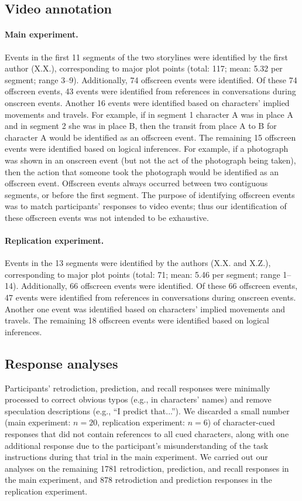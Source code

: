 \documentclass[10pt]{article}
\begin{document}
\subsection*{Video annotation}

\paragraph{Main experiment.} Events in the first 11 segments of the two storylines were identified by the first author (X.X.), corresponding to major plot points (total: 117; mean: 5.32 per segment; range 3--9). Additionally, 74 offscreen events were identified. Of these 74 offscreen events, 43 events were identified from references in conversations during onscreen events. Another 16 events were identified based on characters’ implied movements and travels. For example, if in segment 1 character A was in place A and in segment 2 she was in place B, then the transit from place A to B for character A would be identified as an offscreen event. The remaining 15 offscreen events were identified based on logical inferences. For example, if a photograph was shown in an onscreen event (but not the act of the photograph being taken), then the action that someone took the photograph would be identified as an offscreen event. Offscreen events always occurred between two contiguous segments, or before the first segment. The purpose of identifying offscreen events was to match participants’ responses to video events; thus our identification of these offscreen events was not intended to be exhaustive.

\paragraph{Replication experiment.} Events in the 13 segments were identified by the authors (X.X. and X.Z.), corresponding to major plot points (total: 71; mean: 5.46 per segment; range 1--14). Additionally, 66 offscreen events were identified. Of these 66 offscreen events, 47 events were identified from references in conversations during onscreen events. Another one event was identified based on characters’ implied movements and travels. The remaining 18 offscreen events were identified based on logical inferences.

\subsection*{Response analyses}

Participants' retrodiction, prediction, and recall responses were minimally processed to correct obvious typos (e.g., in characters’ names) and remove speculation descriptions (e.g., ``I predict that...''). 
We discarded a small number (main experiment: $n = 20$, replication experiment: $n = 6$) of character-cued responses that did not contain references to all cued characters, along with one additional response due to the participant's misunderstanding of the task instructions during that trial in the main experiment. We carried out our analyses on the remaining 1781 retrodiction, prediction, and recall responses in the main experiment, and 878 retrodiction and prediction responses in the replication experiment.
 
\end{document}
